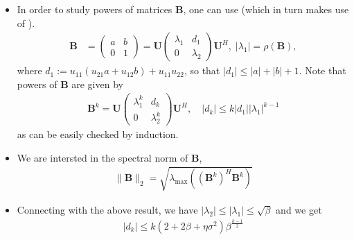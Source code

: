 \documentclass{article}
\newcommand{\mB}{{\mathbf B}}
\newcommand{\mU}{{\mathbf U}}
\begin{document}
\begin{enumerate}
\begin{itemize}
\item 
In order to study powers of matrices $\mB$, one can use \cite[Lemma 8]{jung2017fixed} (which in turn makes use of \cite[Lemma 7.1.2]{golub2012matrix}).
\begin{align}
\mB & = \begin{pmatrix} a & b \\ 0 & 1 \end{pmatrix} 
=  \mU \begin{pmatrix} \lambda_1 & d_1 \\ 0 & \lambda_2  \end{pmatrix} \mU^H, \; |\lambda_1| = \rho(\mB),
\end{align}
where $d_1 := u_{11} (u_{21} a + u_{12} b) + u_{11} u_{22}$, so that $|d_1| \le |a| + |b| +1$.
Note that powers of $\mB$ are given by 
\begin{align}
\mB^k = \mU \begin{pmatrix} \lambda_1^k & d_k  \\ 0 & \lambda_2^k \end{pmatrix} \mU^H, \quad |d_k| \le k |d_1| |\lambda_1|^{k-1}
\end{align}
as can be easily checked by induction. 
\item We are intersted in the spectral norm of $\mB$,
\begin{align}
\| \mB\|_2 = \sqrt{\lambda_{\max}((\mB^k)^H \mB^k)}
\end{align}
\item Connecting with the above result, we have $|\lambda_2| \le |\lambda_1| \le \sqrt{\beta}$ and we get 
\begin{align}
|d_k| \le k (2+2\beta+ \eta \sigma^2)\beta^{\frac{k-1}{2}}
\end{align}
\end{itemize}

\newpage


\end{enumerate}
\end{document}
